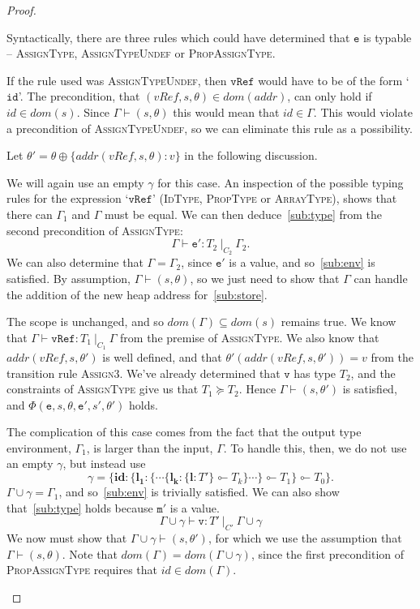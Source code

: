 \documentclass[12pt,a4paper,twoside,openright]{report}
\theoremstyle{definition}
\theoremstyle{dotless}
\newcommand*{\orig}{\ensuremath{\!\multimapinv\!}}
\begin{document}
\begin{proof}
\begin{case}[Assign]
	Syntactically, there are three rules which could have determined that
	$\mathtt{e}$ is typable -- \textsc{AssignType}, \textsc{AssignTypeUndef} or
	\textsc{PropAssignType}. 

	If the rule used was \textsc{AssignTypeUndef}, then $\mathtt{vRef}$ would
	have to be of the form `$\mathtt{id}$'. The precondition, that $(vRef,s,
	\theta)\in dom(addr)$, can only hold if $id\in dom(s)$. Since
	$\Gamma\vdash(s,\theta)$ this would mean that $id\in\Gamma$. This would
	violate a precondition of \textsc{AssignTypeUndef}, so we can eliminate
	this rule as a possibility.

	Let $\theta'=\theta\oplus\{addr(vRef,s,\theta):v\}$ in the following discussion.

	\begin{subcase}[AssignType]
	  We will again use an empty $\gamma$ for this case.
	  An inspection of the possible typing rules for the expression `$\mathtt{vRef}$'
	  (\textsc{IdType, PropType} or \textsc{ArrayType}), shows that there can
	  $\Gamma_1$ and $\Gamma$ must be equal.
	  We can then deduce~\eqref{sub:type} from the second precondition of \textsc{AssignType}:
	  $$\Gamma\vdash\mathtt{e'}:T_2\ |_{C_2}\ \Gamma_2.$$ 
	  We can also determine that $\Gamma=\Gamma_2$, since $\mathtt{e'}$ is a value, and
	  so~\eqref{sub:env} is satisfied. By assumption, $\Gamma\vdash(s,\theta)$, so
	  we just need to show that
	  $\Gamma$ can handle the addition of the new heap address for~\eqref{sub:store}.

 	  The scope is unchanged, and so $dom(\Gamma)\subseteq dom(s)$ remains true.
	  We know that $\Gamma\vdash\mathtt{vRef}:T_1\ |_{C_1}\ \Gamma$ from the premise of 
	  \textsc{AssignType}. We also know that $addr(vRef, s, \theta')$ is 
	  well defined, and that $\theta'(addr(vRef, s, \theta')) = v$ 
	  from the transition rule \textsc{Assign3}. We've already determined
	  that $\mathtt{v}$ has type $T_2$, and the constraints of \textsc{AssignType}
	  give us that $T_1\succeq T_2$. Hence $\Gamma\vdash(s,\theta')$ is satisfied,
	  and $\Phi(\mathtt{e},s,\theta,\mathtt{e'},s',\theta')$ holds.
  	\end{subcase}

	\begin{subcase}[PropAssignType]
	  The complication of this case comes from
	  the fact that the output type environment, $\Gamma_1$, is larger than the input, $\Gamma$.
	  To handle this, then, we do not use an empty $\gamma$, but instead use
	  $$\gamma=\{\textbf{id}: \{ \mathbf{l_1}: \{\cdots \{\mathbf{l_k}:\{\mathbf{l}: T'\}\orig T_k \} \cdots\} \orig T_1\}\orig T_0\}.$$
	  $\Gamma\!\cup\!\gamma=\Gamma_1$, and so~\eqref{sub:env} is trivially
	  satisfied. We can also show that~\eqref{sub:type} holds because $\mathtt{m'}$ is a value.
	  $$\Gamma\!\cup\!\gamma\vdash\mathtt{v}:T'\ |_{C'}\ \Gamma\!\cup\!\gamma$$
	  We now must show that $\Gamma\!\cup\!\gamma\vdash(s,
	  \theta')$, for which we use the assumption that
	  $\Gamma\vdash(s,\theta)$. Note that
	  $dom(\Gamma)=dom(\Gamma\!\cup\!\gamma)$, since the first precondition
	  of \textsc{PropAssignType} requires that $id\in dom(\Gamma)$.


\end{subcase}
\end{case}
\end{proof}
\end{document}
